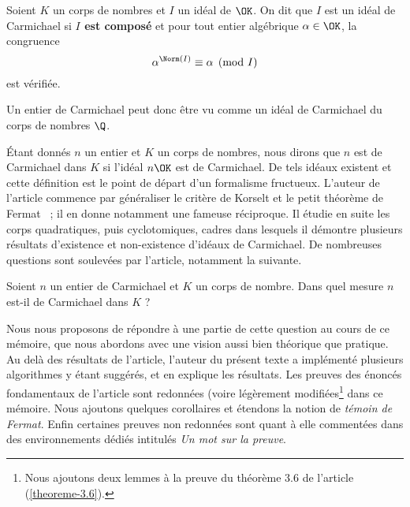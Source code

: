 \begin{definition} Soient $K$ un corps de nombres et $I$ un idéal de $\OK$. On dit que $I$ est un idéal de Carmichael si \textbf{$I$ est composé} et pour tout entier algébrique $\alpha \in \OK$, la congruence
	\begin{equation}\label{congruence-Carmichael}
		\alpha^{\Norm(I)} \equiv \alpha \pmod{I}
	\end{equation}
est vérifiée.
\end{definition}

\begin{remarque}
	Un entier de Carmichael peut donc être vu comme un idéal de Carmichael du corps de nombres $\Q$.
\end{remarque}

Étant donnés $n$ un entier et $K$ un corps de nombres, nous dirons que $n$ est de Carmichael dans $K$ si l'idéal $n\OK$ est de Carmichael. De tels idéaux existent et cette définition est le point de départ d'un formalisme fructueux. L'auteur de l'article commence par généraliser le critère de Korselt et le petit théorème de Fermat ~; il en donne notamment une fameuse réciproque. Il étudie en suite les corps quadratiques, puis cyclotomiques, cadres dans lesquels il démontre plusieurs résultats d'existence et non-existence d'idéaux de Carmichael. De nombreuses questions sont soulevées par l'article, notamment la suivante. 

\begin{question}\label{question-centrale}Soient $n$ un entier de Carmichael et $K$ un corps de nombre. Dans quel mesure $n$ est-il de Carmichael dans $K$ ?
\end{question}

Nous nous proposons de répondre à une partie de cette question au cours de ce mémoire, que nous abordons avec une vision aussi bien théorique que pratique. Au delà des résultats de l'article, l'auteur du présent texte a implémenté plusieurs algorithmes y étant suggérés, et en explique les résultats. Les preuves des énoncés fondamentaux de l'article sont redonnées (voire légèrement modifiées\footnote{Nous ajoutons deux lemmes à la preuve du théorème 3.6 de l'article (\ref{theoreme-3.6}).} dans ce mémoire. Nous ajoutons quelques corollaires et étendons la notion de \emph{témoin de Fermat}. Enfin certaines preuves non redonnées sont quant à elle commentées dans des environnements dédiés intitulés \textit{Un mot sur la preuve}.
